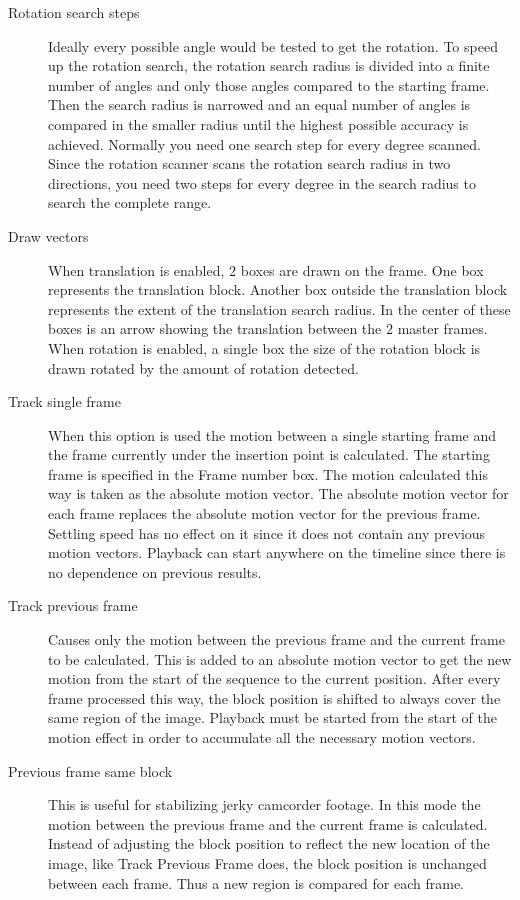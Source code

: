 \begin{description}
    \item[Rotation search steps] Ideally every possible angle would be tested to get the rotation. To speed up the rotation search, the rotation search radius is divided into a finite number of angles and only those angles compared to the starting frame. Then the search radius is narrowed and an equal number of angles is compared in the smaller radius until the highest possible accuracy is achieved. Normally you need one search step for every degree scanned. Since the rotation scanner scans the rotation search radius in two directions, you need two steps for every degree in the search radius to search the complete range.
    \item[Draw vectors] When translation is enabled, $2$ boxes are drawn on the frame. One box represents the translation block. Another box outside the translation block represents the extent of the translation search radius. In the center of these boxes is an arrow showing the translation between the $2$ master frames. When rotation is enabled, a single box the size of the rotation block is drawn rotated by the amount of rotation detected.
    \item[Track single frame] When this option is used the motion between a single starting frame and the frame currently under the insertion point is calculated. The starting frame is specified in the Frame number box. The motion calculated this way is taken as the absolute motion vector. The absolute motion vector for each frame replaces the absolute motion vector for the previous frame. Settling speed has no effect on it since it does not contain any previous motion vectors. Playback can start anywhere on the timeline since there is no dependence on previous results.
    \item[Track previous frame] Causes only the motion between the previous frame and the current frame to be calculated. This is added to an absolute motion vector to get the new motion from the start of the sequence to the current position. After every frame processed this way, the block position is shifted to always cover the same region of the image. Playback must be started from the start of the motion effect in order to accumulate all the necessary motion vectors.
    \item[Previous frame same block] This is useful for stabilizing jerky camcorder footage. In this mode the motion between the previous frame and the current frame is calculated. Instead of adjusting the block position to reflect the new location of the image, like Track Previous Frame does, the block position is unchanged between each frame. Thus a new region is compared for each frame.

\end{description}
